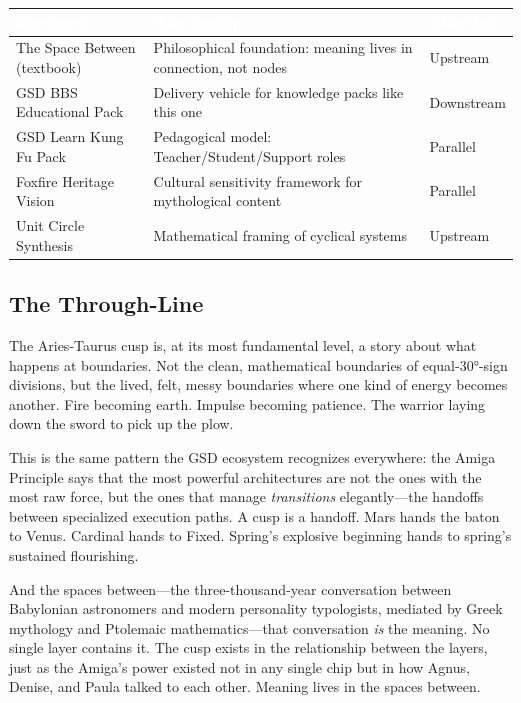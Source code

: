 \documentclass[11pt,letterpaper]{article}
\newcommand{\tableheader}[1]{\textbf{\sffamily\textcolor{white}{#1}}}
\begin{document}
\begin{center}
\begin{tabularx}{\textwidth}{L{4.5cm}XC{2cm}}
\toprule
{}
\tableheader{Document} & \tableheader{Relationship} & \tableheader{Direction} \\
\midrule
The Space Between (textbook) & Philosophical foundation: meaning lives in connection, not nodes & Upstream \\
GSD BBS Educational Pack & Delivery vehicle for knowledge packs like this one & Downstream \\
GSD Learn Kung Fu Pack & Pedagogical model: Teacher/Student/Support roles & Parallel \\
Foxfire Heritage Vision & Cultural sensitivity framework for mythological content & Parallel \\
Unit Circle Synthesis & Mathematical framing of cyclical systems & Upstream \\
\bottomrule
\end{tabularx}
\end{center}

\subsection{The Through-Line}

The Aries-Taurus cusp is, at its most fundamental level, a story about what happens at boundaries. Not the clean, mathematical boundaries of equal-30°-sign divisions, but the lived, felt, messy boundaries where one kind of energy becomes another. Fire becoming earth. Impulse becoming patience. The warrior laying down the sword to pick up the plow.

This is the same pattern the GSD ecosystem recognizes everywhere: the Amiga Principle says that the most powerful architectures are not the ones with the most raw force, but the ones that manage \textit{transitions} elegantly---the handoffs between specialized execution paths. A cusp is a handoff. Mars hands the baton to Venus. Cardinal hands to Fixed. Spring's explosive beginning hands to spring's sustained flourishing.

And the spaces between---the three-thousand-year conversation between Babylonian astronomers and modern personality typologists, mediated by Greek mythology and Ptolemaic mathematics---that conversation \textit{is} the meaning. No single layer contains it. The cusp exists in the relationship between the layers, just as the Amiga's power existed not in any single chip but in how Agnus, Denise, and Paula talked to each other. Meaning lives in the spaces between.
\end{document}
